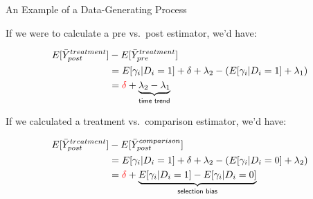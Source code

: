 \documentclass[10pt,xcolor=table,ignorenonframetext,handout,aspectratio=169]{beamer}
\begin{document}

\begin{frame}{An Example of a Data-Generating Process}


\medskip
If we were to calculate a pre vs.~post estimator, we'd have:
\begin{small}
	\begingroup
	\addtolength{\jot}{1em}
	\begin{align*}
	E [ \bar{Y}^{treatment}_{post} ] &- E [ \bar{Y}^{treatment}_{pre} ] \\
	&= E [ \gamma_i \vert D_i = 1 ] + \delta + \lambda_2 - \left( E [ \gamma_i \vert D_i = 1 ] + \lambda_1 \right) \\
	&= \textcolor{red}{\delta} +  \underbrace{\lambda_2 - \lambda_1}_{\textsf{time trend}}
	\end{align*}
	\endgroup
\end{small}

\pause
\medskip
If we calculated a treatment vs.~comparison estimator, we'd have:
\begin{small}
	\begingroup
	\addtolength{\jot}{1em}
	\begin{align*}
	E [ \bar{Y}^{treatment}_{post} ] &- E [ \bar{Y}^{comparison}_{post} ] \\
	&= E [ \gamma_i \vert D_i = 1 ] + \delta + \lambda_2 - \left( E [ \gamma_i \vert D_i = 0 ] + \lambda_2 \right) \\
	&= \textcolor{red}{\delta} +  \underbrace{E [ \gamma_i \vert D_i = 1 ] - E [ \gamma_i \vert D_i = 0 ]}_{\textsf{selection bias}}
	\end{align*}
	\endgroup
\end{small}


\end{frame}



\end{document}
